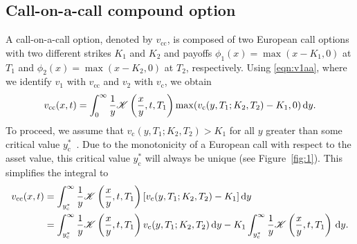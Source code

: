 \subsection{Call-on-a-call compound option}
A call-on-a-call option, denoted by $v_{\text{cc}}$, is composed of two European call options with two different strikes $K_1$ and $K_2$ and payoffs $\phi_1(x) = \max(x - K_1, 0)$ at $T_1$ and $\phi_2(x) = \max(x - K_2, 0)$ at $T_2$, respectively. Using \eqref{eqn:v1aa}, where we identify $v_1$ with $v_\mathrm{cc}$ and $v_2$ with $v_\mathrm{c}$, we obtain
	\begin{equation*}
		v_{\text{cc}}(x,t) = \int_0^\infty \frac{1}{y} \mathscr K\left( \frac{x}{y}, t, T_1 \right)\max(v_\text{c}(y,T_1; K_2, T_2) - K_1, 0)\, \mathrm d y.
	\end{equation*}
To proceed, we assume that $v_{\text{c}}(y,T_1; K_2, T_2) > K_1$ for all $y$ greater than some critical value $y_\mathrm{c}^*$~\cite{Kwok2008}. Due to the monotonicity of a European call with respect to the asset value, this critical value $y_\mathrm{c}^*$ will always be unique (see Figure~\ref{fig:1}). This simplifies the integral to
	\begin{align*}
		v_{\text{cc}}(x,t) &= \int_{y_\mathrm{c}^*}^\infty \frac{1}{y}\mathscr K\left( \frac{x}{y}, t, T_1 \right)[v_\text{c}(y,T_1; K_2, T_2) - K_1] \, \mathrm d y \\
		&= \int_{y_\mathrm{c}^*}^\infty \frac{1}{y} \mathscr K\left( \frac{x}{y}, t, T_1 \right)v_\text{c}(y,T_1; K_2, T_2) \, \mathrm d y - K_1\int_{y_\mathrm{c}^*}^\infty \frac{1}{y}\mathscr K\left( \frac{x}{y}, t, T_1 \right) \, \mathrm d y.
	\end{align*}

